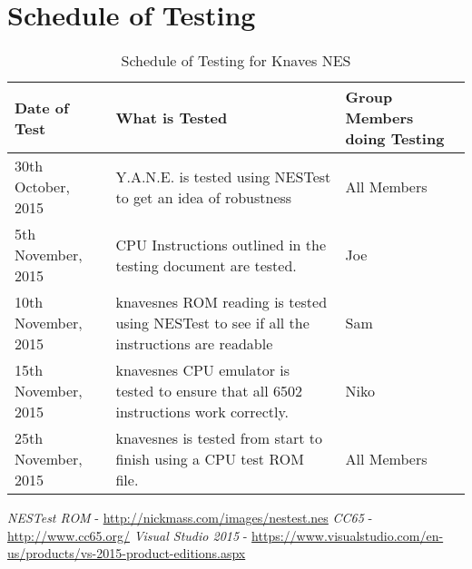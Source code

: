 \documentclass[12pt]{article}
\begin{document}
\section{Schedule of Testing}
	\begin{table}[!ht]
		\centering
		\begin{tabular}{| p{2in} | p{2in} | p{2in} |}
			\hline
			Date of Test & What is Tested & Group Members doing Testing\\
			\hline
			30th October, 2015 & Y.A.N.E. is tested using NESTest to get an idea of robustness & All Members\\
			\hline
			5th November, 2015 & CPU Instructions outlined in the testing document are tested. & Joe\\
			\hline
			10th November, 2015 & knavesnes ROM reading is tested using NESTest to see if all the instructions are readable & Sam\\
			\hline
			15th November, 2015 & knavesnes CPU emulator is tested to ensure that all 6502 instructions work correctly. & Niko\\
			\hline
			25th November, 2015 & knavesnes is tested from start to finish using a CPU test ROM file. & All Members\\
			\hline
		\end{tabular}
		\caption{Schedule of Testing for Knaves NES}
	\end{table}
\clearpage

\hypertarget{refs}{}
\begin{thebibliography}{99}
 \emph{NESTest ROM} - \url{http://nickmass.com/images/nestest.nes}
 \emph{CC65} - \url{http://www.cc65.org/}
 \emph{Visual Studio 2015} - \url{https://www.visualstudio.com/en-us/products/vs-2015-product-editions.aspx}
\end{thebibliography}
\end{document}
